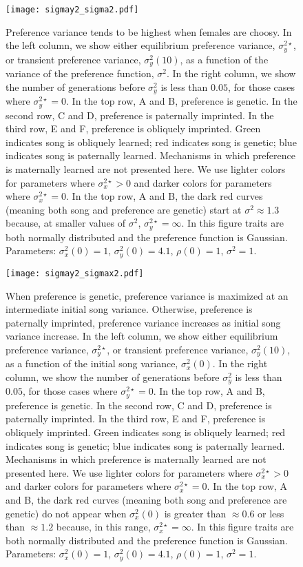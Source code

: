 \documentclass{article}
\begin{document}
\begin{figure}
\texttt{[image: sigmay2\_sigma2.pdf]}
\caption{\label{sigmay2_sigma2} 
Preference variance tends to be highest when females are choosy.  
In the left column, we show either equilibrium preference variance, $\sigma_y^{2\star}$, or transient preference variance, $\sigma_y^2(10)$, as a function of the variance of the preference function, $\sigma^2$. In the right column, we show the number of generations before $\sigma_y^2$ is less than $0.05$, for those cases where $\sigma_y^{2\star}=0$. In the top row, A and B, preference is genetic. In the second row, C and D, preference is paternally imprinted. In the third row, E and F, preference is obliquely imprinted. Green indicates song is obliquely learned; red indicates song is genetic; blue indicates song is paternally learned. Mechanisms in which preference is maternally learned are not presented here.  We use lighter colors for parameters where $\sigma_x^{2\star}>0$ and darker colors for parameters where $\sigma_x^{2\star}=0$. In the top row, A and B, the dark red curves (meaning both song and preference are genetic) start at $\sigma^2\approx 1.3$ because, at smaller values of $\sigma^2$, $\sigma_y^{2\star}=\infty$. In this figure traits are both normally distributed and the preference function is Gaussian. Parameters: $\sigma_x^2(0)=1$, $\sigma_y^2(0)=4.1$, $\rho(0)=1$, $\sigma^2=1$. 
}
\end{figure}

\begin{figure}
\texttt{[image: sigmay2\_sigmax2.pdf]}
\caption{\label{sigmay2_sigmax2} When preference is genetic, preference variance is maximized at an intermediate initial song variance. Otherwise, preference is paternally imprinted, preference variance increases as initial song variance increase. 
In the left column, we show either equilibrium preference variance, $\sigma_y^{2\star}$, or transient preference variance, $\sigma_y^2(10)$, as a function of the initial song variance, $\sigma_x^2(0)$. In the right column, we show the number of generations before $\sigma_y^2$ is less than $0.05$, for those cases where $\sigma_y^{2\star}=0$. In the top row, A and B, preference is genetic. In the second row, C and D, preference is paternally imprinted. In the third row, E and F, preference is obliquely imprinted. Green indicates song is obliquely learned; red indicates song is genetic; blue indicates song is paternally learned. Mechanisms in which preference is maternally learned are not presented here. We use lighter colors for parameters where $\sigma_x^{2\star}>0$ and darker colors for parameters where $\sigma_x^{2\star}=0$. In the top row, A and B, the dark red curves (meaning both song and preference are genetic) do not appear when $\sigma_x^2(0)$ is greater than $\approx 0.6$ or less than $\approx 1.2$ because, in this range, $\sigma_x^{2\star}=\infty$.  In this figure traits are both normally distributed and the preference function is Gaussian. Parameters: $\sigma_x^2(0)=1$, $\sigma_y^2(0)=4.1$, $\rho(0)=1$, $\sigma^2=1$.}
\end{figure}
\end{document}
